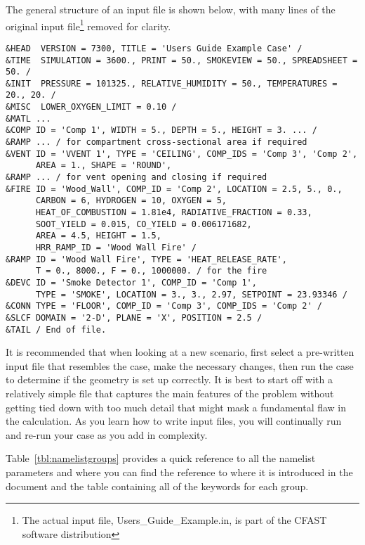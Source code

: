 The general structure of an input file is shown below, with many lines of the original input file\footnote{The actual input file, Users\_Guide\_Example.in, is part of the CFAST software distribution} removed for clarity.

\begin{lstlisting}
&HEAD  VERSION = 7300, TITLE = 'Users Guide Example Case' /
&TIME  SIMULATION = 3600., PRINT = 50., SMOKEVIEW = 50., SPREADSHEET = 50. /
&INIT  PRESSURE = 101325., RELATIVE_HUMIDITY = 50., TEMPERATURES = 20., 20. /
&MISC  LOWER_OXYGEN_LIMIT = 0.10 /
&MATL ...
&COMP ID = 'Comp 1', WIDTH = 5., DEPTH = 5., HEIGHT = 3. ... /
&RAMP ... / for compartment cross-sectional area if required
&VENT ID = 'VVENT 1', TYPE = 'CEILING', COMP_IDS = 'Comp 3', 'Comp 2',
      AREA = 1., SHAPE = 'ROUND',
&RAMP ... / for vent opening and closing if required
&FIRE ID = 'Wood_Wall', COMP_ID = 'Comp 2', LOCATION = 2.5, 5., 0.,
      CARBON = 6, HYDROGEN = 10, OXYGEN = 5,
      HEAT_OF_COMBUSTION = 1.81e4, RADIATIVE_FRACTION = 0.33,
      SOOT_YIELD = 0.015, CO_YIELD = 0.006171682,
      AREA = 4.5, HEIGHT = 1.5,
      HRR_RAMP_ID = 'Wood Wall Fire' /
&RAMP ID = 'Wood Wall Fire', TYPE = 'HEAT_RELEASE_RATE',
      T = 0., 8000., F = 0., 1000000. / for the fire
&DEVC ID = 'Smoke Detector 1', COMP_ID = 'Comp 1',
      TYPE = 'SMOKE', LOCATION = 3., 3., 2.97, SETPOINT = 23.93346 /
&CONN TYPE = 'FLOOR', COMP_ID = 'Comp 3', COMP_IDS = 'Comp 2' /
&SLCF DOMAIN = '2-D', PLANE = 'X', POSITION = 2.5 /
&TAIL / End of file.
\end{lstlisting}
It is recommended that when looking at a new scenario, first select a pre-written input file that resembles the case, make the necessary changes, then run the case to determine if the geometry is set up correctly. It is best to start off with a relatively simple file that captures the main features of the problem without getting tied down with too much detail that might mask a fundamental flaw in the calculation. As you learn how to write input files, you will continually run and re-run your case as you add in complexity.

Table~\ref{tbl:namelistgroups} provides a quick reference to all the namelist parameters and where you can find the reference to where it is introduced in the document and the table containing all of the keywords for each group.


